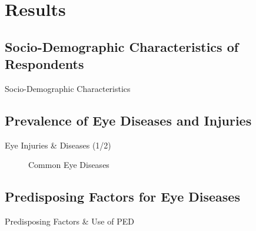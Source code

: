 \section{Results}

\subsection{Socio-Demographic Characteristics of Respondents}

\begin{frame}{Socio-Demographic Characteristics}

\end{frame}


\subsection{Prevalence of Eye Diseases and Injuries}

\begin{frame}{Eye Injuries \& Diseases (1/2)}

    \begin{figure}
        \centering
        \resizebox{\textwidth}{!}{}
        \caption{Common Eye Diseases}
    \end{figure}
    

\end{frame}



\subsection{Predisposing Factors for Eye Diseases}


\begin{frame}[shrink=35]{Predisposing Factors \& Use of PED}
    \begin{multicols}{2}
        

        

    \end{multicols}

\end{frame}


